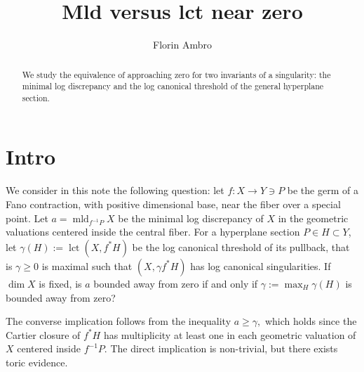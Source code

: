 \documentclass[12pt,twoside]{amsart}
\author{Florin Ambro}
\newcommand{\lct}{\operatorname{lct}}
\newcommand{\mld}{\operatorname{mld}}
\theoremstyle{plain}
\theoremstyle{definition}
\theoremstyle{remark}
\begin{document}

\title{Mld versus lct near zero}
\maketitle


\begin{abstract} 
We study the equivalence of approaching zero for two invariants of a singularity:
the minimal log discrepancy and the log canonical threshold of the 
general hyperplane section.
\end{abstract} 






\section{Intro}


We consider in this note the following question: let $f\colon X\to Y\ni P$ be the germ 
of a Fano contraction, with positive dimensional base, near the fiber over a special point. 
Let $a=\mld_{f^{-1}P}X$ be the minimal log discrepancy of $X$
in the geometric valuations centered inside the central fiber. For a hyperplane section
$P\in H\subset Y$, let $\gamma(H):=\lct(X,f^*H)$ be the log canonical threshold of
its pullback, that is $\gamma \ge 0$ is maximal such that $(X,\gamma f^*H)$ has log canonical singularities.
If $\dim X$ is fixed, is $a$ bounded away from zero if and only if $\gamma:=\max_H\gamma(H)$ is bounded away from zero?

The converse implication follows from the inequality 
$
a\ge \gamma,
$
which holds since the Cartier closure of $f^*H$ has multiplicity at least one in each 
geometric valuation of $X$ centered inside $f^{-1}P$. The direct implication is non-trivial,
but there exists toric evidence.
\end{document}
